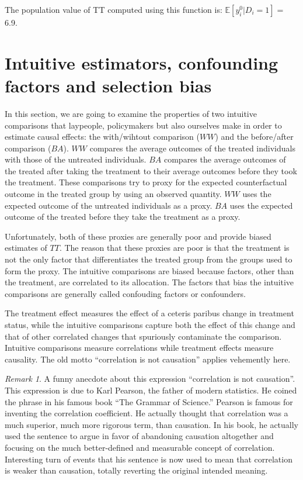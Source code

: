 \documentclass[
]{book}
\newcommand{\esp}[1]{\mathbb{E}[ #1 ]}
\theoremstyle{definition}
\theoremstyle{definition}
\theoremstyle{definition}
\theoremstyle{definition}
\theoremstyle{remark}
\newtheorem*{remark}{Remark}
\begin{document}
The population value of TT computed using this function is: \(\esp{y_i^0|D_i=1}=\) 6.9.

\hypertarget{intuitive-estimators-confounding-factors-and-selection-bias}{%
\section{Intuitive estimators, confounding factors and selection bias}\label{intuitive-estimators-confounding-factors-and-selection-bias}}

In this section, we are going to examine the properties of two intuitive comparisons that laypeople, policymakers but also ourselves make in order to estimate causal effects: the with/wihtout comparison (\(WW\)) and the before/after comparison (\(BA\)).
\(WW\) compares the average outcomes of the treated individuals with those of the untreated individuals.
\(BA\) compares the average outcomes of the treated after taking the treatment to their average outcomes before they took the treatment.
These comparisons try to proxy for the expected counterfactual outcome in the treated group by using an observed quantity.
\(WW\) uses the expected outcome of the untreated individuals as a proxy.
\(BA\) uses the expected outcome of the treated before they take the treatment as a proxy.

Unfortunately, both of these proxies are generally poor and provide biased estimates of \(TT\).
The reason that these proxies are poor is that the treatment is not the only factor that differentiates the treated group from the groups used to form the proxy.
The intuitive comparisons are biased because factors, other than the treatment, are correlated to its allocation.
The factors that bias the intuitive comparisons are generally called confouding factors or confounders.

The treatment effect measures the effect of a ceteris paribus change in treatment status, while the intuitive comparisons capture both the effect of this change and that of other correlated changes that spuriously contaminate the comparison.
Intuitive comparisons measure correlations while treatment effects measure causality.
The old motto ``correlation is not causation'' applies vehemently here.

\begin{remark}
\iffalse{} {Remark. } \fi{}A funny anecdote about this expression ``correlation is not causation''.
This expression is due to Karl Pearson, the father of modern statistics.
He coined the phrase in his famous book ``The Grammar of Science.''
Pearson is famous for inventing the correlation coefficient.
He actually thought that correlation was a much superior, much more rigorous term, than causation.
In his book, he actually used the sentence to argue in favor of abandoning causation altogether and focusing on the much better-defined and measurable concept of correlation.
Interesting turn of events that his sentence is now used to mean that correlation is weaker than causation, totally reverting the original intended meaning.
\end{remark}
\end{document}
